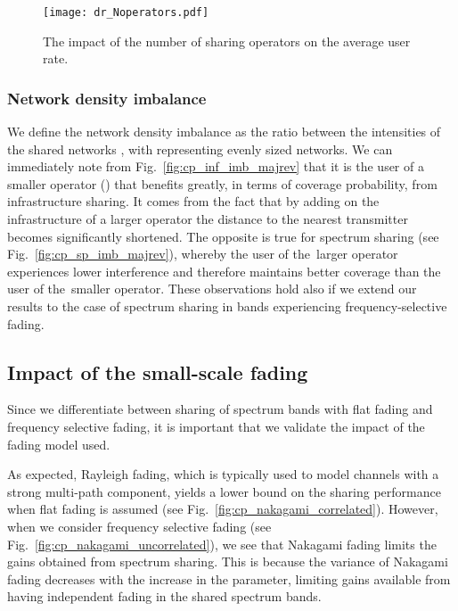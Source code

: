 \documentclass[12pt, journal,doublecolumn, final]{IEEEtran}
\newcommand{\Fig}[1]{Fig.~\ref{fig:#1}}
\begin{document}
\begin{figure}[tb!]
\centering
	\texttt{[image: dr\_Noperators.pdf]}
		\vspace{-5mm}
	\caption{
	The impact of the number of sharing operators on the average user rate.
	}
	\label{fig:dr_Noperators}
\end{figure}

\subsubsection{Network density imbalance}

We define the network density imbalance as the ratio between the intensities of the shared networks , with  representing evenly sized networks. We can immediately note from \Fig{cp_inf_imb_majrev} that it is the user of a smaller operator () that benefits greatly, in terms of coverage probability, from infrastructure sharing. It comes from the fact that by adding on the infrastructure of a larger operator the distance to the nearest transmitter becomes significantly shortened. The opposite is true for spectrum sharing (see \Fig{cp_sp_imb_majrev}), whereby the user of the~larger operator experiences lower interference and therefore maintains better coverage than the user of the~smaller operator. These observations hold also if we extend our results to the case of spectrum sharing in bands experiencing frequency-selective fading.

\begin{figure*}[tb!]
\centering
{}
}
\subfigure[Spectrum sharing 	(flat fading) \label{fig:cp_sp_imb_majrev}]{
 \texttt{[image: \{cp\_sp\_imb\_majrev]}.pdf}
 }
\caption{The impact of network density imbalance on the coverage probability, for a user of a network with density .}
\label{fig:inf_imb_majrev}
\end{figure*}

\subsection{Impact of the small-scale fading}

Since we differentiate between sharing of spectrum bands with flat fading and frequency selective fading, it is important that we validate the impact of the fading model used.

As expected, Rayleigh fading, which is typically used to model channels with a strong multi-path component, yields a lower bound on the sharing performance when flat fading is assumed (see \Fig{cp_nakagami_correlated}). However, when we consider frequency selective fading (see \Fig{cp_nakagami_uncorrelated}), we see that Nakagami fading limits the gains obtained from spectrum sharing. This is because the variance of Nakagami fading decreases with the increase in the  parameter, limiting gains available from having independent fading in the shared spectrum bands.
\end{document}
